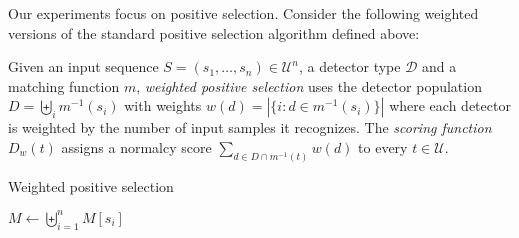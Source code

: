 \documentclass{llncs}
\begin{document}
Our experiments focus on positive selection. 
Consider the following weighted versions of the standard positive  
selection algorithm defined above:

Given an input sequence  $S=(s_1,\ldots,s_n) \in \mathcal{U}^n$, a detector type $\mathcal{D}$ and a matching function $m$, %
\emph{weighted positive selection} uses the detector population $D = \biguplus_i m^{-1}(s_i)$ with weights $w(d) = |\{i : d \in m^{-1}(s_i)\}|$ where each detector is weighted by the number of input samples it recognizes.
The \emph{scoring function} $D_w(t)$ assigns a normalcy score $\sum_{d \in D \cap m^{-1}(t)} w(d)$
to every $t \in \mathcal{U}$.

\begin{algorithm}
\caption{Weighted positive selection}



$M \gets \biguplus_{i=1}^{n} M[s_i]$ 

\label{algorithmweightedpossel}
\end{algorithm}




\end{document}
